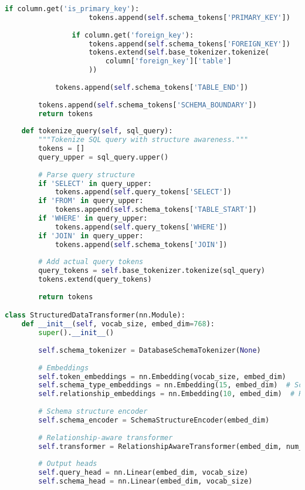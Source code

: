 \begin{lstlisting}[language=Python, caption=Schema-aware database tokenization system]
                if column.get('is_primary_key'):
                    tokens.append(self.schema_tokens['PRIMARY_KEY'])
                
                if column.get('foreign_key'):
                    tokens.append(self.schema_tokens['FOREIGN_KEY'])
                    tokens.extend(self.base_tokenizer.tokenize(
                        column['foreign_key']['table']
                    ))
            
            tokens.append(self.schema_tokens['TABLE_END'])
        
        tokens.append(self.schema_tokens['SCHEMA_BOUNDARY'])
        return tokens
    
    def tokenize_query(self, sql_query):
        """Tokenize SQL query with structure awareness."""
        tokens = []
        query_upper = sql_query.upper()
        
        # Parse query structure
        if 'SELECT' in query_upper:
            tokens.append(self.query_tokens['SELECT'])
        if 'FROM' in query_upper:
            tokens.append(self.schema_tokens['TABLE_START'])
        if 'WHERE' in query_upper:
            tokens.append(self.query_tokens['WHERE'])
        if 'JOIN' in query_upper:
            tokens.append(self.schema_tokens['JOIN'])
        
        # Add actual query tokens
        query_tokens = self.base_tokenizer.tokenize(sql_query)
        tokens.extend(query_tokens)
        
        return tokens

class StructuredDataTransformer(nn.Module):
    def __init__(self, vocab_size, embed_dim=768):
        super().__init__()
        
        self.schema_tokenizer = DatabaseSchemaTokenizer(None)
        
        # Embeddings
        self.token_embeddings = nn.Embedding(vocab_size, embed_dim)
        self.schema_type_embeddings = nn.Embedding(15, embed_dim)  # Schema element types
        self.relationship_embeddings = nn.Embedding(10, embed_dim)  # Relationship types
        
        # Schema structure encoder
        self.schema_encoder = SchemaStructureEncoder(embed_dim)
        
        # Relationship-aware transformer
        self.transformer = RelationshipAwareTransformer(embed_dim, num_layers=12)
        
        # Output heads
        self.query_head = nn.Linear(embed_dim, vocab_size)
        self.schema_head = nn.Linear(embed_dim, vocab_size)
        

\end{lstlisting}
